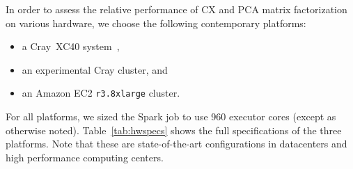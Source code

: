  In order to assess the relative performance of CX and PCA matrix factorization on various hardware, we choose the following contemporary platforms:
 \begin{itemize}
 \item a Cray\textregistered~XC40\textsuperscript{\tiny\texttrademark}
 system~\cite{alverson2012cray,craycascadesc12},
 \item an experimental Cray cluster, and
 \item an Amazon EC2 \texttt{r3.8xlarge} cluster.
 \end{itemize}

 For all platforms, we sized the Spark job to use 960 executor cores (except as
 otherwise noted).  Table~\ref{tab:hwspecs} shows the full specifications of
 the three platforms. Note that these are state-of-the-art configurations in
 datacenters and high performance computing centers. 

